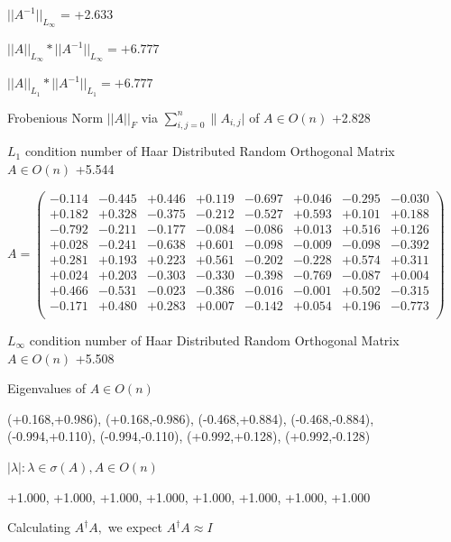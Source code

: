 \documentclass[9pt]{article}
\theoremstyle{plain}
\theoremstyle{definition}
\theoremstyle{remark}
\numberwithin{equation}{section}
\begin{document}
$||A^{-1}||_{L_{\infty}}$ = +2.633

$||A||_{L_{\infty}} * ||A^{-1}||_{L_{\infty}} = +6.777$

$||A||_{L_1} * ||A^{-1}||_{L_1} = +6.777$

Frobenious Norm  $||A||_{\textit{F}}$ via $\sum\limits_{i,j =0}^{n} \|A_{i,j}|$   of  $A \in O(n)$  +2.828

$L_1$ condition number of Haar Distributed Random Orthogonal Matrix $A \in O(n)$ +5.544

$A = \left(
\begin{array}{
cccccccc}
-0.114 & -0.445 & +0.446 & +0.119 & -0.697 & +0.046 & -0.295 & -0.030 \\
+0.182 & +0.328 & -0.375 & -0.212 & -0.527 & +0.593 & +0.101 & +0.188 \\
-0.792 & -0.211 & -0.177 & -0.084 & -0.086 & +0.013 & +0.516 & +0.126 \\
+0.028 & -0.241 & -0.638 & +0.601 & -0.098 & -0.009 & -0.098 & -0.392 \\
+0.281 & +0.193 & +0.223 & +0.561 & -0.202 & -0.228 & +0.574 & +0.311 \\
+0.024 & +0.203 & -0.303 & -0.330 & -0.398 & -0.769 & -0.087 & +0.004 \\
+0.466 & -0.531 & -0.023 & -0.386 & -0.016 & -0.001 & +0.502 & -0.315 \\
-0.171 & +0.480 & +0.283 & +0.007 & -0.142 & +0.054 & +0.196 & -0.773 \\
\end{array}
\right)$ \newline 

$L_{\infty}$ condition number of Haar Distributed Random Orthogonal Matrix $A \in O(n)$ +5.508

Eigenvalues of $A \in O(n)$

(+0.168,+0.986), (+0.168,-0.986), (-0.468,+0.884), (-0.468,-0.884), (-0.994,+0.110), (-0.994,-0.110), (+0.992,+0.128), (+0.992,-0.128)

 $|\lambda | : \lambda \in \sigma(A) , A \in O(n)$

+1.000, +1.000, +1.000, +1.000, +1.000, +1.000, +1.000, +1.000


Calculating $A^{\dag} A,$  we expect $A^{\dag} A \approx I$
\end{document}
